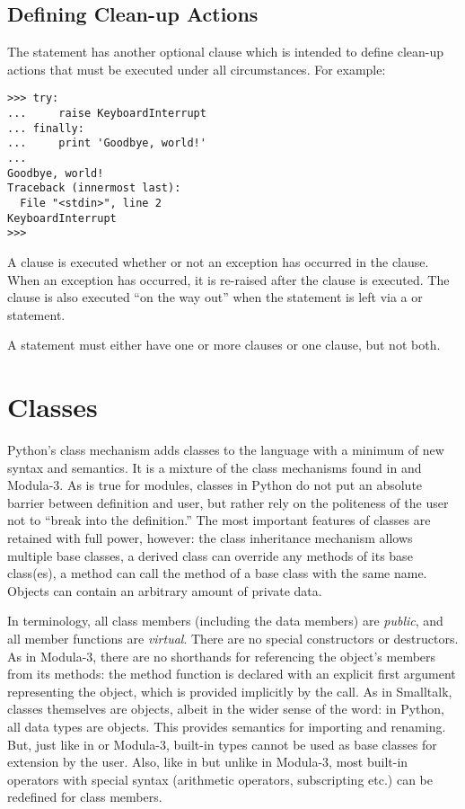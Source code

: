 %

\section{Defining Clean-up Actions}

The  statement has another optional clause which is intended to
define clean-up actions that must be executed under all circumstances.
For example:

\bcode\begin{verbatim}
>>> try:
...     raise KeyboardInterrupt
... finally:
...     print 'Goodbye, world!'
... 
Goodbye, world!
Traceback (innermost last):
  File "<stdin>", line 2
KeyboardInterrupt
>>> 
\end{verbatim}\ecode
%
A  clause is executed whether or not an exception has
occurred in the  clause.  When an exception has occurred, it
is re-raised after the  clause is executed.  The
 clause is also executed ``on the way out'' when the
 statement is left via a  or 
statement.

A  statement must either have one or more 
clauses or one  clause, but not both.

\chapter{Classes}

Python's class mechanism adds classes to the language with a minimum
of new syntax and semantics.  It is a mixture of the class mechanisms
found in \Cpp{} and Modula-3.  As is true for modules, classes in Python
do not put an absolute barrier between definition and user, but rather
rely on the politeness of the user not to ``break into the
definition.''  The most important features of classes are retained
with full power, however: the class inheritance mechanism allows
multiple base classes, a derived class can override any methods of its
base class(es), a method can call the method of a base class with the
same name.  Objects can contain an arbitrary amount of private data.

In \Cpp{} terminology, all class members (including the data members) are
\emph{public}, and all member functions are \emph{virtual}.  There are
no special constructors or destructors.  As in Modula-3, there are no
shorthands for referencing the object's members from its methods: the
method function is declared with an explicit first argument
representing the object, which is provided implicitly by the call.  As
in Smalltalk, classes themselves are objects, albeit in the wider
sense of the word: in Python, all data types are objects.  This
provides semantics for importing and renaming.  But, just like in \Cpp{}
or Modula-3, built-in types cannot be used as base classes for
extension by the user.  Also, like in \Cpp{} but unlike in Modula-3, most
built-in operators with special syntax (arithmetic operators,
subscripting etc.) can be redefined for class members.

